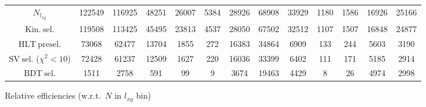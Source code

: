 \documentclass[10pt,a4paper]{article}
\begin{document}
\begin{landscape}
{\begin{tabular}{c|cccc|cccc|cccc}
\midrule
$N_{l_{xy}}$ & 122549 & 116925 & 48251 & 26007 & 5384 & 28926 & 68908 & 33929 & 1180 & 1586 & 16926 & 25166\\
$\mathrm{Kin.\ sel.}$ & 119508 & 113425 & 45495 & 23813 & 4537 & 28050 & 67502 & 32512 & 1107 & 1507 & 16848 & 24877\\
$\mathrm{HLT\ presel.}$ & 73068 & 62477 & 13704 & 1855 & 272 & 16383 & 34864 & 6909 & 133 & 244 & 5603 & 3190\\
$\mathrm{SV\ sel.}$ ($\chi^2{<}10$) & 72428 & 61237 & 12509 & 1627 & 220 & 16036 & 33399 & 6402 & 111 & 171 & 5185 & 2914\\
$\mathrm{BDT\ sel.}$ & 1511 & 2758 & 591 & 99 & 9 & 3674 & 19463 & 4429 & 8 & 26 & 4974 & 2998\\
\bottomrule
\end{tabular}}

\vspace{18pt}

Relative efficiencies (w.r.t.\ $N$ in $l_{xy}$ bin)


\end{landscape}
\end{document}
